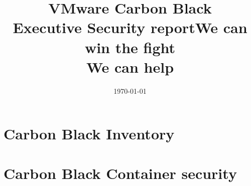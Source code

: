 \documentclass[12pt,letterpaper]{report}
\begin{document}
\thispagestyle{empty}
\bannercbcontainer
\title{VMware Carbon Black\\Executive Security report}

\date{\today}
\logocbcontainer

\newpage

\tableofcontents
\listoffigures

\chapter{Carbon Black Inventory}


\chapter{Carbon Black Container security}


%

%

\newpage

\printglossaries

\newpage
\thispagestyle{empty}
\bannercbcontainer
\vspace{2cm}
\title{We can win the fight\\We can help}

\logocbcontainer
\end{document}
